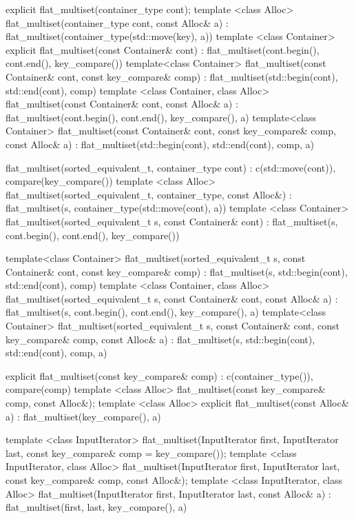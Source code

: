 \begin{codeblock}
\begin{codeblock}
\begin{codeblock}
\begin{addedblock}
\begin{codeblock}
{    explicit flat_multiset(container_type cont);
    template <class Alloc>
      flat_multiset(container_type cont, const Alloc& a)
        : flat_multiset(container_type(std::move(key), a)) { }
    template <class Container>
      explicit flat_multiset(const Container& cont)
        : flat_multiset(cont.begin(), cont.end(), key_compare()) { }
    template<class Container>
    flat_multiset(const Container& cont, const key_compare& comp)
        : flat_multiset(std::begin(cont), std::end(cont), comp) { }
    template <class Container, class Alloc>
      flat_multiset(const Container& cont, const Alloc& a)
        : flat_multiset(cont.begin(), cont.end(), key_compare(), a) { }
    template<class Container>
    flat_multiset(const Container& cont, const key_compare& comp, const Alloc& a)
        : flat_multiset(std::begin(cont), std::end(cont), comp, a) { }

    flat_multiset(sorted_equivalent_t, container_type cont)
      : c(std::move(cont)), compare(key_compare()) { }
    template <class Alloc>
      flat_multiset(sorted_equivalent_t, container_type, const Alloc&)
        : flat_multiset(s, container_type(std::move(cont), a)) { }
    template <class Container>
      flat_multiset(sorted_equivalent_t s, const Container& cont)
        : flat_multiset(s, cont.begin(), cont.end(), key_compare()) { }

    template<class Container>
    flat_multiset(sorted_equivalent_t s, const Container& cont, const key_compare& comp)
        : flat_multiset(s, std::begin(cont), std::end(cont), comp) { }
    template <class Container, class Alloc>
      flat_multiset(sorted_equivalent_t s, const Container& cont, const Alloc& a)
        : flat_multiset(s, cont.begin(), cont.end(), key_compare(), a) { }
    template<class Container>
    flat_multiset(sorted_equivalent_t s, const Container& cont, const key_compare& comp, const Alloc& a)
        : flat_multiset(s, std::begin(cont), std::end(cont), comp, a) { }

    explicit flat_multiset(const key_compare& comp)
      : c(container_type()), compare(comp) { }
    template <class Alloc>
      flat_multiset(const key_compare& comp, const Alloc&);
    template <class Alloc>
      explicit flat_multiset(const Alloc& a)
        : flat_multiset(key_compare(), a) { }

    template <class InputIterator>
      flat_multiset(InputIterator first, InputIterator last,
                    const key_compare& comp = key_compare());
    template <class InputIterator, class Alloc>
      flat_multiset(InputIterator first, InputIterator last,
                    const key_compare& comp, const Alloc&);
    template <class InputIterator, class Alloc>
      flat_multiset(InputIterator first, InputIterator last,
                    const Alloc& a)
        : flat_multiset(first, last, key_compare(), a) { }

}
\end{codeblock}
\end{addedblock}
\end{codeblock}
\end{codeblock}
\end{codeblock}

